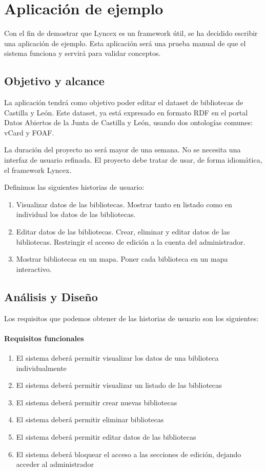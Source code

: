 \documentclass[openright,twoside,12pt]{book}
\begin{document}
\chapter{Aplicación de ejemplo}

Con el fin de demostrar que Lyncex es un framework útil, se ha decidido escribir una aplicación de ejemplo. Esta aplicación será una prueba manual de que el sistema funciona y servirá para validar conceptos.

\section{Objetivo y alcance}

La aplicación tendrá como objetivo poder editar el dataset de bibliotecas de Castilla y León. Este dataset, ya está expresado en formato RDF en el portal Datos Abiertos de la Junta de Castilla y León, usando dos ontologías comunes: vCard y FOAF.

La duración del proyecto no será mayor de una semana. No se necesita una interfaz de usuario refinada. El proyecto debe tratar de usar, de forma idiomática, el framework Lyncex.

Definimos las siguientes historias de usuario:
\begin{enumerate}
    \item Visualizar datos de las bibliotecas. Mostrar tanto en listado como en individual los datos de las bibliotecas.
    \item Editar datos de las bibliotecas. Crear, eliminar y editar datos de las bibliotecas. Restringir el acceso de edición a la cuenta del administrador.
    \item Mostrar bibliotecas en un mapa. Poner cada biblioteca en un mapa interactivo.
\end{enumerate}

\section{Análisis y Diseño}

Los requisitos que podemos obtener de las historias de usuario son los siguientes:

\subsubsection{Requisitos funcionales}
\begin{enumerate}
    \item El sistema deberá permitir visualizar los datos de una biblioteca individualmente
    \item El sistema deberá permitir visualizar un listado de las bibliotecas
    \item El sistema deberá permitir crear nuevas bibliotecas 
    \item El sistema deberá permitir eliminar bibliotecas
    \item El sistema deberá permitir editar datos de las bibliotecas
    \item El sistema deberá bloquear el acceso a las secciones de edición, dejando acceder al administrador
\end{enumerate}
\end{document}
